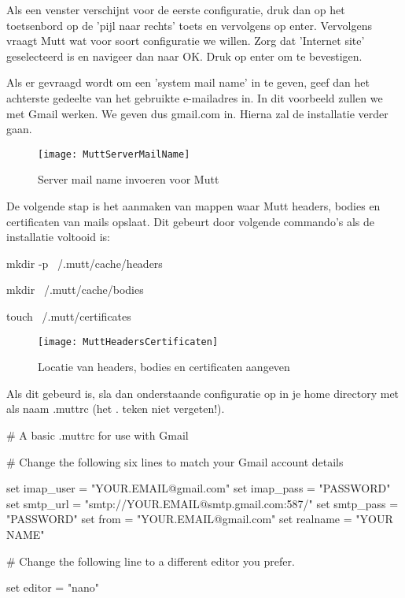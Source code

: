 \documentclass[12pt]{article}
\begin{document}
Als een venster verschijnt voor de eerste configuratie, druk dan op het toetsenbord op de 'pijl naar rechts' toets en vervolgens op enter. Vervolgens vraagt Mutt wat voor soort configuratie we willen. Zorg dat 'Internet site' geselecteerd is en navigeer dan naar OK. Druk op enter om te bevestigen.

Als er gevraagd wordt om een 'system mail name' in te geven, geef dan het achterste gedeelte van het gebruikte e-mailadres in. In dit voorbeeld zullen we met Gmail werken. We geven dus gmail.com in. Hierna zal de installatie verder gaan.
\begin{figure} [h]
\begin{center}
	\texttt{[image: MuttServerMailName]}
\end{center}
	\caption{Server mail name invoeren voor Mutt}
\end{figure}

De volgende stap is het aanmaken van mappen waar Mutt headers, bodies en certificaten van mails opslaat. Dit gebeurt door volgende commando's als de installatie voltooid is:


mkdir -p ~/.mutt/cache/headers


mkdir ~/.mutt/cache/bodies


touch ~/.mutt/certificates

\begin{figure} [!h]
\begin{center}
	\texttt{[image: MuttHeadersCertificaten]}
\end{center}
	\caption{Locatie van headers, bodies en certificaten aangeven}
\end{figure}

Als dit gebeurd is, sla dan onderstaande configuratie op in je home directory met als naam .muttrc (het . teken niet vergeten!).

\vspace{10mm}

\# A basic .muttrc for use with Gmail

\# Change the following six lines to match your Gmail account details


set imap\_user = "YOUR.EMAIL@gmail.com"
set imap\_pass = "PASSWORD"
set smtp\_url = "smtp://YOUR.EMAIL@smtp.gmail.com:587/"
set smtp\_pass = "PASSWORD"
set from = "YOUR.EMAIL@gmail.com"
set realname = "YOUR NAME"

\# Change the following line to a different editor you prefer.


set editor = "nano"
\end{document}
